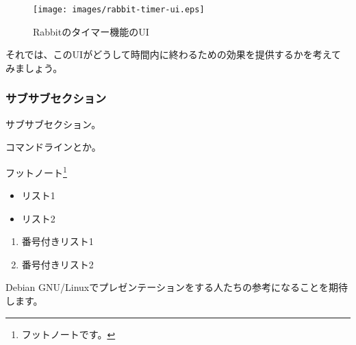 \documentclass[mingoth,a4paper]{jsarticle}
\begin{document}
\begin{figure}[ht]
  \begin{center}
    \texttt{[image: images/rabbit-timer-ui.eps]}
  \end{center}
  \caption{Rabbitのタイマー機能のUI}
  \label{fig:rabbit-timer-ui}
\end{figure}

それでは、このUIがどうして時間内に終わるための効果を提供するかを考えて
みましょう。

\subsubsection{サブサブセクション}

サブサブセクション。

\begin{commandline}
コマンドラインとか。
\end{commandline}

フットノート\footnote{フットノートです。}

\begin{itemize}
\item リスト1
\item リスト2
\end{itemize}


\begin{enumerate}
\item 番号付きリスト1
\item 番号付きリスト2
\end{enumerate}

Debian GNU/Linuxでプレゼンテーションをする人たちの参考になることを期待
します。
\end{document}
